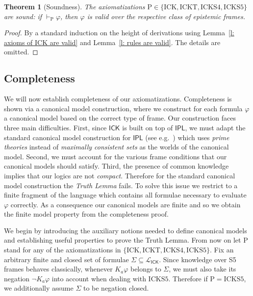 \documentclass{myifcolog}
\newcommand{\agi}{a}
\newcommand{\ICK}{\mathsf{ICK}}
\newcommand{\LICK}{\mathcal{L}_{\ICK}}
\newcommand{\hick}{\mathrm{ICK}}
\newcommand{\hickt}{\mathrm{ICKT}}
\newcommand{\hicks}{\mathrm{ICKS4}}
\newcommand{\hickss}{\mathrm{ICKS5}}
\newcommand{\hickp}{\mathrm{P}}
\newtheorem{theorem}{Theorem}
\numberwithin{theorem}{section}
\begin{document}
\begin{theorem}[Soundness]\label{t: soundness}
    The axiomatizations $\hickp \in \{\hick, \hickt, \hicks, \hickss\}$ are sound: if $ \vdash_\mathrm{P} \varphi$, then $ \varphi$ is valid over the respective class of epistemic frames.
\end{theorem}
\begin{proof}
    By a standard induction on the height of derivations using Lemma~\ref{l: axioms of ICK are valid} and Lemma~\ref{l: rules are valid}. The details are omitted. \qedhere
\end{proof}

\subsection{Completeness}

We will now establish completeness of our axiomatizations. Completeness is shown via a canonical model construction, where we construct for each formula $\varphi$ a canonical model based on the correct type of frame. Our construction faces three main difficulties. First, since $\ICK$ is built on top of $\mathsf{IPL}$, we must adapt the standard canonical model construction for $\mathsf{IPL}$ (see e.g.~\cite{Bezhanishvili_?}) which uses \emph{prime theories} instead of \emph{maximally consistent sets} as the worlds of the canonical model. Second, we must account for the various frame conditions that our canonical models should satisfy. Third, the presence of common knowledge implies that our logics are not \emph{compact}. Therefore for the standard canonical model construction the \emph{Truth Lemma} fails. To solve this issue we restrict to a finite fragment of the language which contains all formulae necessary to evaluate $\varphi$ correctly. As a consequence our canonical models are finite and so we obtain the finite model property from the completeness proof.

We begin by introducing the auxiliary notions needed to define canonical models and establishing useful properties to prove the Truth Lemma. From now on let $\hickp$ stand for any of the axiomatizations in $\{\hick, \hickt, \hicks, \hickss\}$. Fix an arbitrary finite and closed set of formulae $\Sigma \subseteq \LICK$. Since knowledge over S5 frames behaves classically, whenever $K_\agi \varphi$ belongs to $\Sigma$, we must also take its negation $\neg K_\agi \varphi$ into account when dealing with $\hickss$. Therefore if $\hickp = \hickss$, we additionally assume $\Sigma$ to be negation closed.
\end{document}
